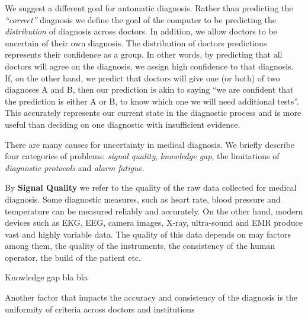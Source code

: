 \documentclass[11pt]{pnas-new}
\begin{document}
We suggest a different goal for automatic diagnosis.
Rather than predicting the {\em ``correct''}
diagnosis we define the goal of the computer to be predicting the {\em
  distribution} of diagnosis across doctors. In addition, we allow
doctors to be uncertain of their own diagnosis.
The distribution of doctors predictions represents their confidence as
a group. In other words, by predicting that all doctors will agree on
the diagnosis, we assign high confidence to that diagnosis. 
If, on the other hand, we
predict that doctors will give one (or both) of two diagnoses A and B, then
our prediction is akin to saying ``we are confident that the prediction
is either A or B, to know which one we will need additional
tests''. This accurately represents our current state in the
diagnostic process and is more useful than deciding on one diagnostic
with insufficient evidence.


\iffalse
It is certainly expected that physicians can achieve a reliable
decision making, probably with sufficient clinical information
\cite{mehta2011agreement} or if only the major information is needed
\cite{atiya2003interobserver}. However, in many cases, the quality of
decision making might be jeopardized due to various reasons, among
which the uncertainty in medicine is non-negligible.
\yoav{I find the previous paragraph unclear and confusing, We should
  talk about it}
\fi

There are many causes for uncertainty in medical diagnosis. We briefly
describe four categories of problems: {\em signal quality}, {\em knowledge gap}, the limitations of {\em
  diagnostic protocols} and {\em alarm fatigue}.


By {\bf Signal Quality} we refer to the quality of the raw data
collected for medical diagnosis. Some diagnostic measures, such
as heart rate, blood pressure and temperature can be measured reliably
and accurately. On the other hand, modern
devices such as EKG, EEG, camera images, X-ray, ultra-sound and EMR
produce vast and highly variable data. The quality of this data
depends on may factors among them, the quality of the instruments, the
consistency of the human operator, the build of the patient etc.


Knowledge gap bla bla


\newpage
Another factor that impacts the accuracy and consistency of the
diagnosis is the uniformity of criteria across doctors and institutions

\end{document}
